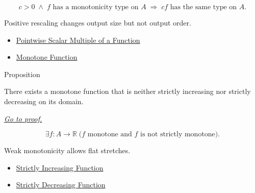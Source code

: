 \begin{remark*}
\[
  c>0\;\wedge\;f\text{ has a monotonicity type on }A
  \;\Longrightarrow\;
  cf\text{ has the same type on }A.
\]
\end{remark*}

\begin{remark*}[Interpretation]
Positive rescaling changes output size but not output order.
\end{remark*}

\begin{dependencies}
\begin{itemize}
  \item \hyperref[def:pointwise-scalar-multiple-of-a-function]{Pointwise Scalar Multiple of a Function}
  \item \hyperref[def:function-monotone]{Monotone Function}
\end{itemize}
\end{dependencies}

\begin{propositionbox}{Proposition}
\begin{proposition}
\label{prop:monotone-need-not-be-strict}
There exists a monotone function that is neither strictly increasing nor
strictly decreasing on its domain.

\smallskip\noindent
\hyperref[prf:monotone-need-not-be-strict]{\textit{Go to proof.}}
\end{proposition}
\end{propositionbox}

\begin{remark*}
\[
  \exists f:A\to\mathbb{R}\;
  \bigl(f\text{ monotone and }f\text{ is not strictly monotone}\bigr).
\]
\end{remark*}

\begin{remark*}[Interpretation]
Weak monotonicity allows flat stretches.
\end{remark*}

\begin{dependencies}
\begin{itemize}
  \item \hyperref[def:function-strictly-increasing]{Strictly Increasing Function}
  \item \hyperref[def:function-strictly-decreasing]{Strictly Decreasing Function}
\end{itemize}
\end{dependencies}

